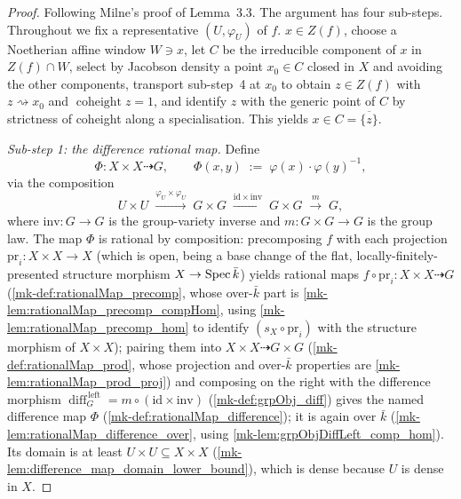 \begin{proof}
  \leanok{}
  Following Milne's proof of Lemma~3.3. The argument has four sub-steps. Throughout we
  fix a representative \((U, \varphi_U)\) of \(f\).
  \(x \in Z(f)\), choose a Noetherian affine window \(W \ni x\), let \(C\) be the
  irreducible component of \(x\) in \(Z(f) \cap W\), select by Jacobson density a point
  \(x_0 \in C\) closed in \(X\) and avoiding the other components, transport
  sub-step~4 at \(x_0\) to obtain \(z \in Z(f)\) with \(z \rightsquigarrow x_0\) and
  \(\operatorname{coheight} z = 1\), and identify \(z\) with the generic point of \(C\)
  by strictness of coheight along a specialisation. This yields
  \(x \in C = \overline{\{z\}}\).

  \emph{Sub-step 1: the difference rational map.} Define
  \[
    \Phi \colon X \times X \dashrightarrow G,
    \qquad
    \Phi(x, y) \;:=\; \varphi(x) \cdot \varphi(y)^{-1},
  \]
  via the composition
  \[
    U \times U
    \;\xrightarrow{\varphi_U \times \varphi_U}\; G \times G
    \;\xrightarrow{\mathrm{id} \times \mathrm{inv}}\; G \times G
    \;\xrightarrow{m}\; G,
  \]
  where \(\mathrm{inv} \colon G \to G\) is the group-variety inverse and
  \(m \colon G \times G \to G\) is the group law. The map \(\Phi\) is rational by
  composition: precomposing \(f\) with each projection
  \(\mathrm{pr}_i \colon X \times X \to X\) (which is open, being a base change of the
  flat, locally-finitely-presented structure morphism \(X \to \operatorname{Spec} \bar k\)) yields
  rational maps \(f \circ \mathrm{pr}_i \colon X \times X \dashrightarrow G\)
  (\ref{mk-def:rationalMap_precomp}, whose over-\(\bar k\) part is
  \ref{mk-lem:rationalMap_precomp_compHom}, using \ref{mk-lem:rationalMap_precomp_hom} to
  identify \((s_X \circ \mathrm{pr}_i)\) with the structure morphism of \(X \times X\));
  pairing them into \(X \times X \dashrightarrow
  G \times G\) (\ref{mk-def:rationalMap_prod}, whose projection and over-\(\bar k\) properties
  are \ref{mk-lem:rationalMap_prod_proj}) and composing on the right with the difference
  morphism \(\operatorname{diff}_G^{\,\mathrm{left}} = m \circ (\mathrm{id} \times \mathrm{inv})\)
  (\ref{mk-def:grpObj_diff}) gives the named difference map \(\Phi\)
  (\ref{mk-def:rationalMap_difference}); it is again over \(\bar k\)
  (\ref{mk-lem:rationalMap_difference_over}, using \ref{mk-lem:grpObjDiffLeft_comp_hom}). Its
  domain is at least \(U \times U \subseteq X \times X\)
  (\ref{mk-lem:difference_map_domain_lower_bound}), which is dense because \(U\) is
  dense in \(X\).


\end{proof}
